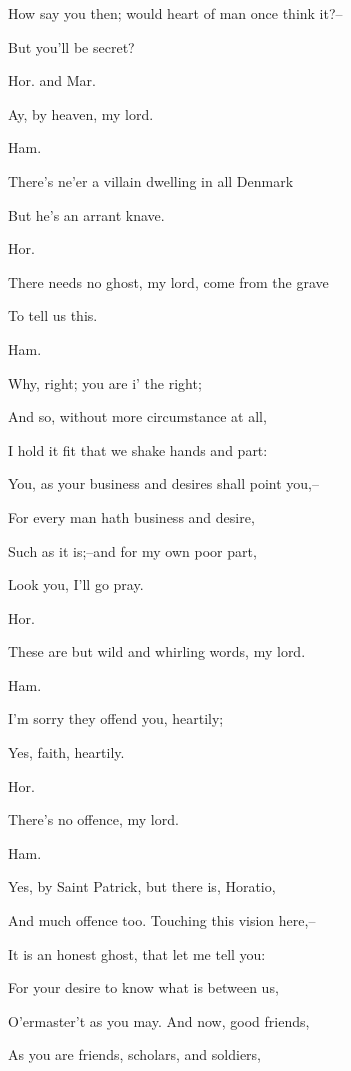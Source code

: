 \documentclass[12pt]{book}
\begin{document}
How say you then; would heart of man once think it?--

But you'll be secret?



Hor. and Mar.

Ay, by heaven, my lord.



Ham.

There's ne'er a villain dwelling in all Denmark

But he's an arrant knave.



Hor.

There needs no ghost, my lord, come from the grave

To tell us this.



Ham.

Why, right; you are i' the right;

And so, without more circumstance at all,

I hold it fit that we shake hands and part:

You, as your business and desires shall point you,--

For every man hath business and desire,

Such as it is;--and for my own poor part,

Look you, I'll go pray.



Hor.

These are but wild and whirling words, my lord.



Ham.

I'm sorry they offend you, heartily;

Yes, faith, heartily.



Hor.

There's no offence, my lord.



Ham.

Yes, by Saint Patrick, but there is, Horatio,

And much offence too. Touching this vision here,--

It is an honest ghost, that let me tell you:

For your desire to know what is between us,

O'ermaster't as you may. And now, good friends,

As you are friends, scholars, and soldiers,
\end{document}
